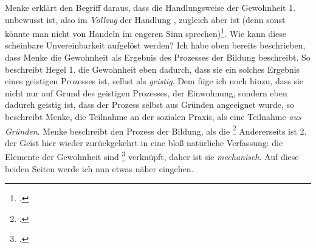 \documentclass[12pt, a4paper, openany]{report}
\begin{document}
Menke erklärt den Begriff  daraus, dass die Handlungsweise der Gewohnheit 1. unbewusst ist, also im \emph{Vollzug} der Handlung , zugleich aber  ist (denn sonst könnte man nicht von Handeln im engeren Sinn sprechen)\footcite[][128]{menke_autonomie_2018}.
Wie kann diese scheinbare Unvereinbarkeit aufgelöst werden?
Ich habe oben bereits beschrieben, dass Menke die Gewohnheit als Ergebnis des Prozesses der Bildung beschreibt.
So beschreibt Hegel 1. die Gewohnheit eben dadurch, dass sie ein solches Ergebnis eines geistigen Prozesses ist, selbst als \emph{geistig}. 
Dem füge ich noch hinzu, dass sie nicht nur auf Grund des geistigen Prozesses, der Einwohnung, sondern eben dadurch geistig ist, dass der Prozess selbst aus Gründen angeeignet wurde, so beschreibt Menke, die Teilnahme an der sozialen Praxis, als eine Teilnahme \emph{aus Gründen}.
Menke beschreibt den Prozess der Bildung, als die \footcite[][129]{menke_autonomie_2018}
Andererseits ist 2. der Geist hier wieder zurückgekehrt in eine bloß natürliche Verfassung: 
die Elemente der Gewohnheit sind \footcite[][129]{menke_autonomie_2018} verknüpft, daher ist sie \emph{mechanisch}.
Auf diese beiden Seiten werde ich nun etwas näher eingehen.\\
\end{document}
